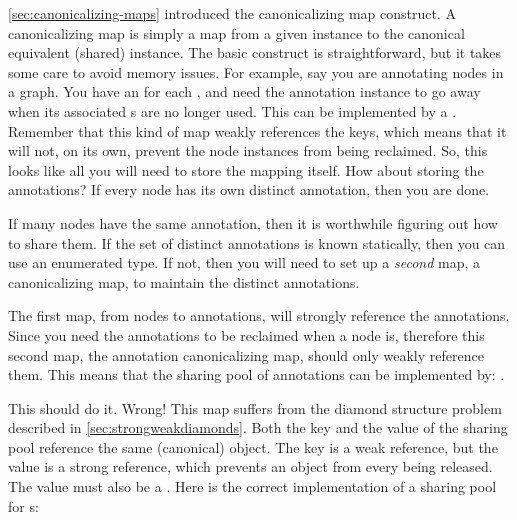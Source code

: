 \autoref{sec:canonicalizing-maps} introduced the canonicalizing map construct. A
canonicalizing map is simply a map from a given instance to the canonical
equivalent (shared) instance. The basic construct is straightforward, but it
takes some care to avoid memory issues. For example, say you are annotating
nodes in a graph. You have an  for each , and need
the annotation instance to go away when its associated s are no
longer used. This can be implemented by a .
Remember that this kind of map weakly references the keys, which means that it
will not, on its own, prevent the node instances from being reclaimed. So, this
looks like all you will need to store the mapping itself. How about storing the
annotations? If every node has its own distinct annotation, then you are done.

If many nodes have the same annotation, then it is worthwhile figuring out how
to share them. If the set of distinct annotations is known statically, then you
can use an enumerated type. If not, then you will need to set up a \emph{second} map, a
canonicalizing map, to maintain the distinct annotations.

The first map, from nodes to annotations, will strongly reference the
annotations. Since you need the annotations to be reclaimed when a node is,
therefore this second map, the annotation canonicalizing map, should only weakly
reference them. This means that the sharing pool of annotations can be
implemented by: .

This should do it. Wrong! This map suffers from the diamond structure problem
described in \autoref{sec:strongweakdiamonds}. Both the key and the value of
the sharing pool reference the same (canonical)  object. The
key is a weak reference, but the value is a strong reference, which prevents an
 object from every being released. The value must also be a
. Here is the correct implementation of a sharing pool for
s:

